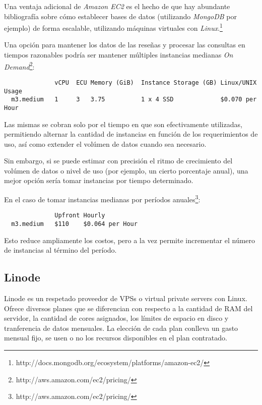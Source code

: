 Una ventaja adicional de \emph{Amazon EC2} es el hecho de que hay abundante bibliografía sobre cómo establecer bases de datos (utilizando \emph{MongoDB} por ejemplo) de forma escalable, utilizando máquinas virtuales con \emph{Linux}.\footnote{http://docs.mongodb.org/ecosystem/platforms/amazon-ec2/}

Una opción para mantener los datos de las reseñas y procesar las consultas en tiempos razonables podría ser mantener múltiples instancias medianas \emph{On Demand}\footnote{http://aws.amazon.com/ec2/pricing/}:

\begin{verbatim}
              vCPU  ECU Memory (GiB)  Instance Storage (GB) Linux/UNIX Usage
  m3.medium   1     3   3.75          1 x 4 SSD             $0.070 per Hour
\end{verbatim}

Las mismas se cobran solo por el tiempo en que son efectivamente utilizadas, permitiendo alternar la cantidad de instancias en función de los requerimientos de uso, así como extender el volúmen de datos cuando sea necesario.

Sin embargo, si se puede estimar con precisión el ritmo de crecimiento del volúmen de datos o nivel de uso (por ejemplo, un cierto porcentaje anual), una mejor opción sería tomar instancias por tiempo determinado. 

En el caso de tomar instancias medianas por períodos anuales\footnote{http://aws.amazon.com/ec2/pricing/}:

\begin{verbatim}
              Upfront Hourly         
  m3.medium   $110    $0.064 per Hour
\end{verbatim}

Esto reduce ampliamente los costos, pero a la vez permite incrementar el número de instancias al término del período.

\subsection{Linode}

Linode es un respetado proveedor de VPSs o virtual private servers con Linux. Ofrece diversos planes que se diferencian con respecto a la cantidad de RAM del servidor, la cantidad de cores asignados, los límites de espacio en disco y tranferencia de datos mensuales. La elección de cada plan conlleva un gasto mensual fijo, se usen o no los recursos disponibles en el plan contratado. 

